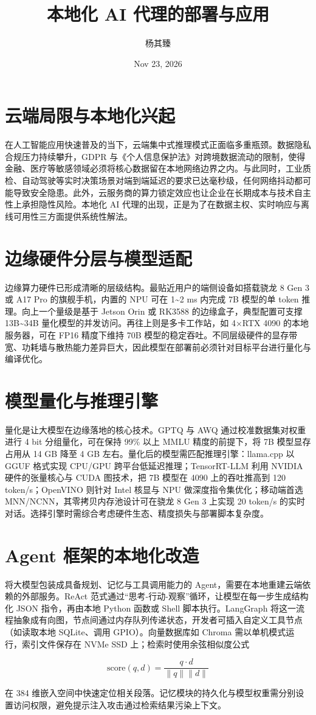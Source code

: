 \title{本地化 AI 代理的部署与应用}
\author{杨其臻}
\date{Nov 23, 2026}
\maketitle
\chapter{云端局限与本地化兴起}
在人工智能应用快速普及的当下，云端集中式推理模式正面临多重瓶颈。数据隐私合规压力持续攀升，GDPR 与《个人信息保护法》对跨境数据流动的限制，使得金融、医疗等敏感领域必须将核心数据留在本地网络边界之内。与此同时，工业质检、自动驾驶等实时决策场景对端到端延迟的要求已达毫秒级，任何网络抖动都可能导致安全隐患。此外，云服务商的算力锁定效应也让企业在长期成本与技术自主性上承担隐性风险。本地化 AI 代理的出现，正是为了在数据主权、实时响应与离线可用性三方面提供系统性解法。\par
\chapter{边缘硬件分层与模型适配}
边缘算力硬件已形成清晰的层级结构。最贴近用户的端侧设备如搭载骁龙 8 Gen 3 或 A17 Pro 的旗舰手机，内置的 NPU 可在 1\~{}2 ms 内完成 7B 模型的单 token 推理。向上一个量级是基于 Jetson Orin 或 RK3588 的边缘盒子，典型配置可支撑 13B\~{}34B 量化模型的并发访问。再往上则是多卡工作站，如 4×RTX 4090 的本地服务器，可在 FP16 精度下维持 70B 模型的稳定吞吐。不同层级硬件的显存带宽、功耗墙与散热能力差异巨大，因此模型在部署前必须针对目标平台进行量化与编译优化。\par
\chapter{模型量化与推理引擎}
量化是让大模型在边缘落地的核心技术。GPTQ 与 AWQ 通过校准数据集对权重进行 4 bit 分组量化，可在保持 99\%{} 以上 MMLU 精度的前提下，将 7B 模型显存占用从 14 GB 降至 4 GB 左右。量化后的模型需匹配推理引擎：llama.cpp 以 GGUF 格式实现 CPU/GPU 跨平台低延迟推理；TensorRT-LLM 利用 NVIDIA 硬件的张量核心与 CUDA 图技术，把 7B 模型在 4090 上的吞吐推高到 120 token/s；OpenVINO 则针对 Intel 核显与 NPU 做深度指令集优化；移动端首选 MNN/NCNN，其零拷贝内存池设计可在骁龙 8 Gen 3 上实现 20 token/s 的实时对话。选择引擎时需综合考虑硬件生态、精度损失与部署脚本复杂度。\par
\chapter{Agent 框架的本地化改造}
将大模型包装成具备规划、记忆与工具调用能力的 Agent，需要在本地重建云端依赖的外部服务。ReAct 范式通过“思考-行动-观察”循环，让模型在每一步生成结构化 JSON 指令，再由本地 Python 函数或 Shell 脚本执行。LangGraph 将这一流程抽象成有向图，节点间通过内存队列传递状态，开发者可插入自定义工具节点（如读取本地 SQLite、调用 GPIO）。向量数据库如 Chroma 需以单机模式运行，索引文件保存在 NVMe SSD 上；检索时使用余弦相似度公式\par
$$ \text{score}(q, d)=\frac{q\cdot d}{\|q\|\|d\|} $$\par
在 384 维嵌入空间中快速定位相关段落。记忆模块的持久化与模型权重需分别设置访问权限，避免提示注入攻击通过检索结果污染上下文。\par
